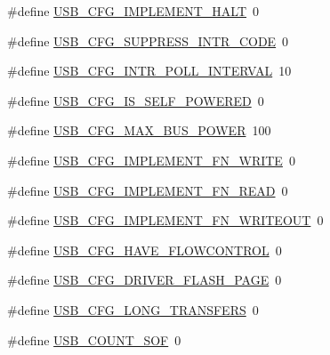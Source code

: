 \begin{DoxyCompactItemize}
\#define \hyperlink{mhvlib-_vusb-_keyboard_2vusb_2usbconfig_8h_af2a9b3ecff1707f1b6554a881a87b954}{U\-S\-B\-\_\-\-C\-F\-G\-\_\-\-I\-M\-P\-L\-E\-M\-E\-N\-T\-\_\-\-H\-A\-L\-T}~0
\item 
\#define \hyperlink{mhvlib-_vusb-_keyboard_2vusb_2usbconfig_8h_a51ab4fa0f312f536ec6d4bc99a75c1b6}{U\-S\-B\-\_\-\-C\-F\-G\-\_\-\-S\-U\-P\-P\-R\-E\-S\-S\-\_\-\-I\-N\-T\-R\-\_\-\-C\-O\-D\-E}~0
\item 
\#define \hyperlink{mhvlib-_vusb-_keyboard_2vusb_2usbconfig_8h_a9cccddfefa62f926a0d7bba9f183a4d3}{U\-S\-B\-\_\-\-C\-F\-G\-\_\-\-I\-N\-T\-R\-\_\-\-P\-O\-L\-L\-\_\-\-I\-N\-T\-E\-R\-V\-A\-L}~10
\item 
\#define \hyperlink{mhvlib-_vusb-_keyboard_2vusb_2usbconfig_8h_ad5fd70b5fabd8abd34d5b9ef7100b709}{U\-S\-B\-\_\-\-C\-F\-G\-\_\-\-I\-S\-\_\-\-S\-E\-L\-F\-\_\-\-P\-O\-W\-E\-R\-E\-D}~0
\item 
\#define \hyperlink{mhvlib-_vusb-_keyboard_2vusb_2usbconfig_8h_abe324d9b00dc186bcbac65ed0f94811c}{U\-S\-B\-\_\-\-C\-F\-G\-\_\-\-M\-A\-X\-\_\-\-B\-U\-S\-\_\-\-P\-O\-W\-E\-R}~100
\item 
\#define \hyperlink{mhvlib-_vusb-_keyboard_2vusb_2usbconfig_8h_a7f117e204e14ff1028ada59f622173f2}{U\-S\-B\-\_\-\-C\-F\-G\-\_\-\-I\-M\-P\-L\-E\-M\-E\-N\-T\-\_\-\-F\-N\-\_\-\-W\-R\-I\-T\-E}~0
\item 
\#define \hyperlink{mhvlib-_vusb-_keyboard_2vusb_2usbconfig_8h_a6be8d20f2d0eb0e87460b26681e60611}{U\-S\-B\-\_\-\-C\-F\-G\-\_\-\-I\-M\-P\-L\-E\-M\-E\-N\-T\-\_\-\-F\-N\-\_\-\-R\-E\-A\-D}~0
\item 
\#define \hyperlink{mhvlib-_vusb-_keyboard_2vusb_2usbconfig_8h_afebecafb2986c559a5d346d601be9de3}{U\-S\-B\-\_\-\-C\-F\-G\-\_\-\-I\-M\-P\-L\-E\-M\-E\-N\-T\-\_\-\-F\-N\-\_\-\-W\-R\-I\-T\-E\-O\-U\-T}~0
\item 
\#define \hyperlink{mhvlib-_vusb-_keyboard_2vusb_2usbconfig_8h_a5495a12e572cdaa8e11358f92d1b324f}{U\-S\-B\-\_\-\-C\-F\-G\-\_\-\-H\-A\-V\-E\-\_\-\-F\-L\-O\-W\-C\-O\-N\-T\-R\-O\-L}~0
\item 
\#define \hyperlink{mhvlib-_vusb-_keyboard_2vusb_2usbconfig_8h_ac0335c6066303683807fc117e336e7c4}{U\-S\-B\-\_\-\-C\-F\-G\-\_\-\-D\-R\-I\-V\-E\-R\-\_\-\-F\-L\-A\-S\-H\-\_\-\-P\-A\-G\-E}~0
\item 
\#define \hyperlink{mhvlib-_vusb-_keyboard_2vusb_2usbconfig_8h_a7a4d92baced8a64f4c150b9b59d20844}{U\-S\-B\-\_\-\-C\-F\-G\-\_\-\-L\-O\-N\-G\-\_\-\-T\-R\-A\-N\-S\-F\-E\-R\-S}~0
\item 
\#define \hyperlink{mhvlib-_vusb-_keyboard_2vusb_2usbconfig_8h_a93e719c32f721d3e4b2dd5ba776da40b}{U\-S\-B\-\_\-\-C\-O\-U\-N\-T\-\_\-\-S\-O\-F}~0

\end{DoxyCompactItemize}
